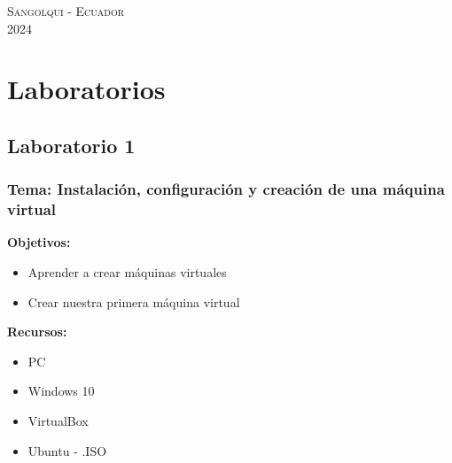 \documentclass[11pt,twoside]{book}
\begin{document}
\begin{center} \Large \textsc{Sangolqui - Ecuador} \\
  \vspace{0.5cm}
  \Large \textsc{2024 } \end{center}
\let\cleardoublepage\clearpage

\chapter{Laboratorios}
\section{Laboratorio 1}
\subsection{Tema: Instalación, configuración y creación de una máquina virtual}

\textbf{Objetivos:}
\begin{itemize}
  \item Aprender a crear máquinas virtuales
  \item Crear nuestra primera máquina virtual
\end{itemize}

\textbf{Recursos:}
\begin{itemize}
  \item PC
  \item Windows 10
  \item VirtualBox
  \item Ubuntu - .ISO
\end{itemize}
\end{document}
